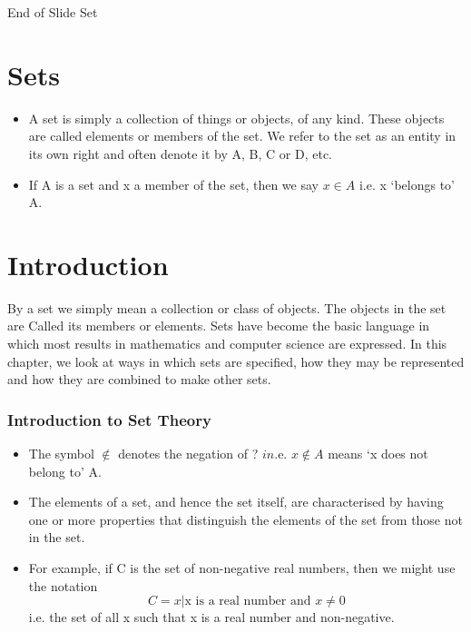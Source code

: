 \documentclass{beamer}
\begin{document}
	
	
	\begin{frame}
		
		End of Slide Set
	\end{frame}



\section{Sets}
\begin{frame}  %
\begin{itemize}
\item A set is simply a collection of things or objects, of any kind. These objects
are called elements or members of the set. We refer to the set as an
entity in its own right and often denote it by A, B, C or D, etc.
\item If A is a set and x a member of the set, then we say $x \in A$ i.e. x ‘belongs to’
A. 
\end{itemize}
\end{frame}
\section{Introduction} %
\begin{frame}
By a set we simply mean a collection or class of objects. The objects in the set are Called its
members or elements. Sets have become the basic language in which most results in mathematics
and computer science are expressed. 
In this chapter, we look at ways in which sets are speciﬁed,
how they may be represented and how they are combined to make other sets.
\end{frame}
\begin{frame}
\frametitle{Introduction to Set Theory}
\begin{itemize}
\item The symbol $\notin$ denotes the negation of ? $in$.e. $x \notin A$ means ‘x does not
belong to’ A.
\item The elements of a set, and hence the set itself, are characterised by having
one or more properties that distinguish the elements of the set from those
not in the set.
\item For example, if C is the set of non-negative real numbers, then we
might use the notation
\[C = {x | \mbox{x is a real number and }x \neq 0}\]
i.e. the set of all x such that x is a real number and non-negative.
\end{itemize}
\end{frame}
\end{document}
